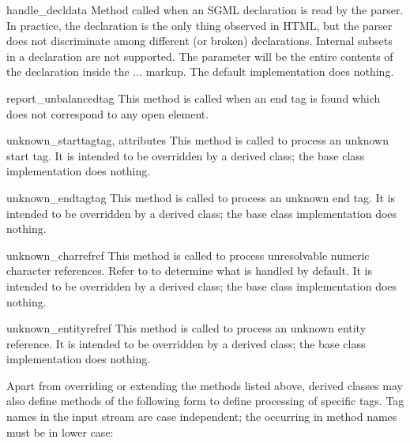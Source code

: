 \begin{methoddesc}{handle_decl}{data}
Method called when an SGML declaration is read by the parser.  In
practice, the  declaration is the only thing observed in
HTML, but the parser does not discriminate among different (or broken)
declarations.  Internal subsets in a  declaration are
not supported.  The  parameter will be the entire contents
of the declaration inside the \code{<!}...\code{>} markup.  The
default implementation does nothing.
\end{methoddesc}

\begin{methoddesc}{report_unbalanced}{tag}
This method is called when an end tag is found which does not
correspond to any open element.
\end{methoddesc}

\begin{methoddesc}{unknown_starttag}{tag, attributes}
This method is called to process an unknown start tag.  It is intended
to be overridden by a derived class; the base class implementation
does nothing.
\end{methoddesc}

\begin{methoddesc}{unknown_endtag}{tag}
This method is called to process an unknown end tag.  It is intended
to be overridden by a derived class; the base class implementation
does nothing.
\end{methoddesc}

\begin{methoddesc}{unknown_charref}{ref}
This method is called to process unresolvable numeric character
references.  Refer to  to determine what is
handled by default.  It is intended to be overridden by a derived
class; the base class implementation does nothing.
\end{methoddesc}

\begin{methoddesc}{unknown_entityref}{ref}
This method is called to process an unknown entity reference.  It is
intended to be overridden by a derived class; the base class
implementation does nothing.
\end{methoddesc}

Apart from overriding or extending the methods listed above, derived
classes may also define methods of the following form to define
processing of specific tags.  Tag names in the input stream are case
independent; the  occurring in method names must be in lower
case:

